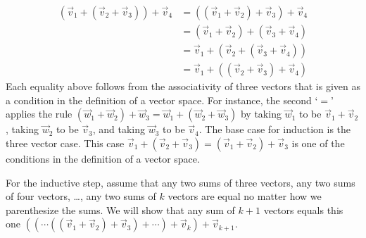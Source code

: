 \begin{exercises}
\begin{answer}
\begin{exparts}
\begin{align*}
            (\vec{v}_1+(\vec{v}_2+\vec{v}_3))+\vec{v}_4
            &=((\vec{v}_1+\vec{v}_2)+\vec{v}_3)+\vec{v}_4  \\
            &=(\vec{v}_1+\vec{v}_2)+(\vec{v}_3+\vec{v}_4)  \\
            &=\vec{v}_1+(\vec{v}_2+(\vec{v}_3+\vec{v}_4))  \\
            &=\vec{v}_1+((\vec{v}_2+\vec{v}_3)+\vec{v}_4)
          \end{align*}
          Each equality above follows from the associativity of three vectors
          that is given as a condition in the definition of a vector space.
          For instance, the second `$=$' applies the rule
          $(\vec{w}_1+\vec{w}_2)+\vec{w}_3=\vec{w}_1+(\vec{w}_2+\vec{w}_3)$
          by taking $\vec{w}_1$ to be $\vec{v}_1+\vec{v}_2$, 
          taking $\vec{w}_2$ to be $\vec{v}_3$, 
          and taking $\vec{w}_3$ to be $\vec{v}_4$. 
        \partsitem The base case for induction is the three vector case.
          This case
          \( \vec{v}_1+(\vec{v}_2+\vec{v}_3)
          =(\vec{v}_1+\vec{v}_2)+\vec{v}_3 \) is one of the conditions in
          the definition of a vector space.

          For the inductive step, assume that any two sums of three vectors,
          any two sums of four vectors,
          \ldots, any two sums of $k$ vectors 
          are equal no matter how we  parenthesize the sums.
          We will show that any sum of \( k+1 \) vectors equals this one
          \( ((\cdots((\vec{v}_1+\vec{v}_2)+\vec{v}_3)+\cdots)+\vec{v}_k)
              +\vec{v}_{k+1} \).


\end{exparts}
\end{answer}
\end{exercises}
